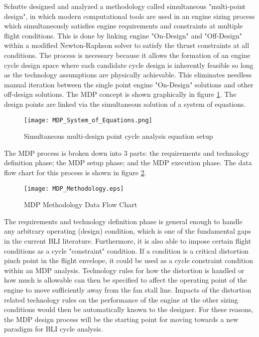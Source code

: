 		\indent Schutte \cite{SchutteThesis} designed and analyzed a methodology called simultaneous "multi-point design", in which modern computational tools are used in an engine sizing process which simultaneously satisfies engine requirements and constraints at multiple flight conditions.  This is done by linking engine "On-Design" and "Off-Design" within a modified Newton-Raphson solver to satisfy the thrust constraints at all conditions.  The process is necessary because it allows the formation of an engine cycle design space where each candidate cycle design is inherently feasible so long as the technology assumptions are physically achievable.  This eliminates needless manual iteration between the single point engine "On-Design" solutions and other off-design solutions.  The MDP concept is shown graphically in figure \ref{MDP_System_of_Equations}.  The design points are linked via the simultaneous solution of a system of equations.		
		\begin{figure}[htpb]
			\centering
			\texttt{[image: MDP\_System\_of\_Equations.png]}
			\caption{Simultaneous multi-design point cycle analysis equation setup \cite{SchutteThesis}}
			\label{MDP_System_of_Equations}
		\end{figure}
		The MDP process is broken down into 3 parts:  the requirements and technology definition phase; the MDP setup phase; and the MDP execution phase.  The data flow chart for this process is shown in figure \ref{MDP_Methodology}.
		\begin{figure}[htp]
			\centering
			\texttt{[image: MDP\_Methodology.eps]}
			\caption{MDP Methodology Data Flow Chart}
			\label{MDP_Methodology}
		\end{figure}		
		The requirements and technology definition phase is general enough to handle any arbitrary operating (design) condition, which is one of the fundamental gaps in the current BLI literature.  Furthermore, it is also able to impose certain flight conditions as a cycle "constraint" condition.  If a condition is a critical distortion pinch point in the flight envelope, it could be used as a cycle constraint condition within an MDP analysis.  Technology rules for how the distortion is handled or how much is allowable can then be specified to affect the operating point of the engine to move sufficiently away from the fan stall line.  Impacts of the distortion related technology rules on the performance of the engine at the other sizing conditions would then be automatically known to the designer.  For these reasons, the MDP design process will be the starting point for moving towards a new paradigm for BLI cycle analysis.
		
